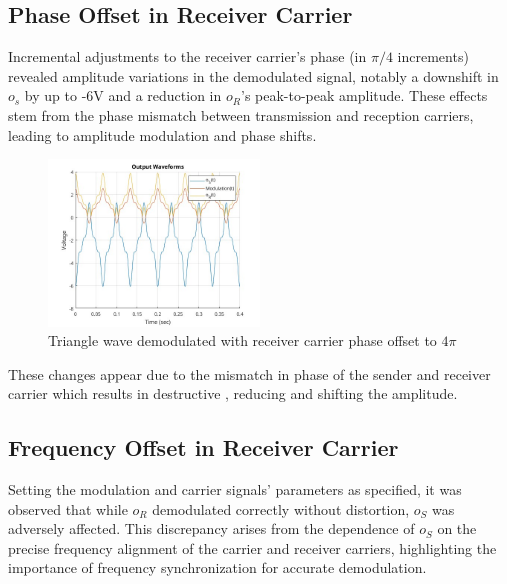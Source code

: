 \documentclass[a4paper, twocolumn]{article}
\begin{document}
        \newpage



        \subsection*{Phase Offset in Receiver Carrier}
        Incremental adjustments to the receiver carrier's phase (in $\pi/4$ increments) revealed amplitude variations in the demodulated signal, notably a downshift in $o_s$ by up to -6V and a reduction in $o_R$'s peak-to-peak amplitude. These effects stem from the phase mismatch between transmission and reception carriers, leading to amplitude modulation and phase shifts.        

        \begin{figure}[htbp]
        \centering

        \includegraphics[width=0.5\textwidth]{Images/AM_RX_1/Triangular Wave/Receiver Carrier Phase Offset/Output Waveforms + 4pi 4.jpg}
        \caption{Triangle wave demodulated with receiver carrier phase offset to $4\pi$ }

        \end{figure}

        These changes appear due to the mismatch in phase of the sender and receiver carrier which results in destructive , reducing and shifting the amplitude.


        \subsection*{Frequency Offset in Receiver Carrier}
        Setting the modulation and carrier signals' parameters as specified, it was observed that while $o_R$ demodulated correctly without distortion, $o_S$ was adversely affected. This discrepancy arises from the dependence of $o_S$ on the precise frequency alignment of the carrier and receiver carriers, highlighting the importance of frequency synchronization for accurate demodulation.
        
\end{document}
